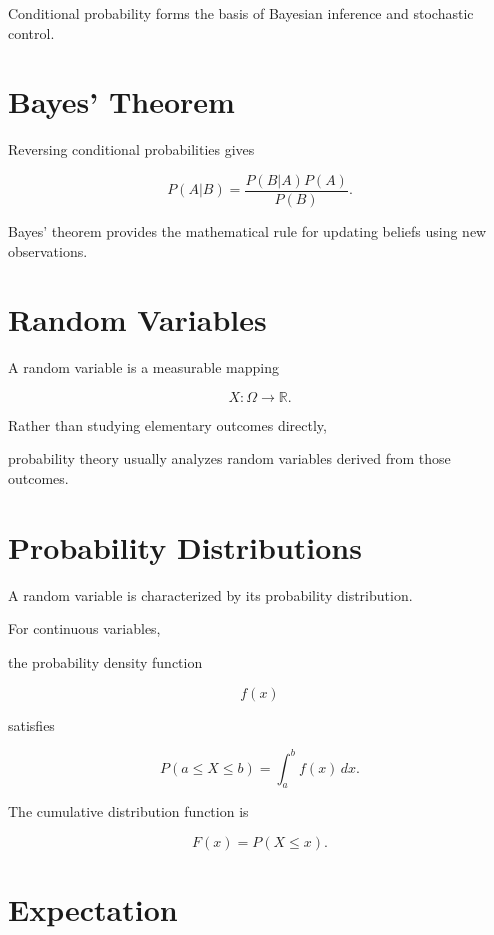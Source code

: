 \documentclass[11pt,fleqn]{book}
\numberwithin{equation}{chapter}
\theoremstyle{plain}
\theoremstyle{definition}
\theoremstyle{remark}
\begin{document}
Conditional probability forms the basis of Bayesian inference and
stochastic control.


\section{Bayes' Theorem}

Reversing conditional probabilities gives

\[
\boxed{
P(A|B)
=
\frac{
P(B|A)P(A)
}
{P(B)}.
}
\]

Bayes' theorem provides the mathematical rule for updating beliefs using
new observations.


\section{Random Variables}

A random variable is a measurable mapping

\[
X:\Omega\rightarrow\mathbb R.
\]

Rather than studying elementary outcomes directly,

probability theory usually analyzes random variables derived from those
outcomes.


\section{Probability Distributions}

A random variable is characterized by its probability distribution.

For continuous variables,

the probability density function

\[
f(x)
\]

satisfies

\[
\boxed{
P(a\le X\le b)
=
\int_a^b
f(x)\,dx.
}
\]

The cumulative distribution function is

\[
F(x)
=
P(X\le x).
\]


\section{Expectation}
\end{document}

